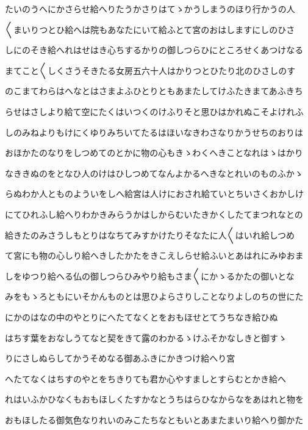 \documentclass[a4paper,11pt,landscape]{ltjtarticle}
\begin{document}
\par\medskip
たいのうへにかさらせ給へりたうかさりはてゝかうしまうのほり行かうの人
\par\medskip
〱まいりつとひ給へは院もあなたにいて給ふとて宮のおはしますにしのひさ
\par\medskip
しにのそき給へれはせはき心ちするかりの御しつらひにところせくあつけなる
\par\medskip
まてこと〱しくさうそきたる女房五六十人はかりつとひたり北のひさしのす
\par\medskip
のこまてわらはへなとはさまよふひとりともあまたしてけふたきまてあふきち
\par\medskip
らせはさしより給て空にたくはいつくのけふりそと思ひはかれぬこそよけれふ
\par\medskip
しのみねよりもけにくゆりみちいてたるはほいなきわさなりかうせちのおりは
\par\medskip
おほかたのなりをしつめてのとかに物の心もきゝわくへきことなれはゝはかり
\par\medskip
なききぬのをとなひ人のけはひしつめてなんよかるへきなとれいのものふかゝ
\par\medskip
らぬわか人とものよういをしへ給宮は人けにおされ給ていとちいさくおかしけ
\par\medskip
にてひれふし給へりわかきみらうかはしからむいたきかくしたてまつれなとの
\par\medskip
給きたのみさうしもとりはなちてみすかけたりそなたに人〱はいれ給しつめ
\par\medskip
て宮にも物の心しり給へきしたかたをきこえしらせ給ふいとあはれにみゆおま
\par\medskip
しをゆつり給へる仏の御しつらひみやり給もさま〱にかゝるかたの御いとな
\par\medskip
みをもゝろともにいそかんものとは思ひよらさりしことなりよしのちの世にた
\par\medskip
にかのはなの中のやとりにへたてなくとをおもほせとてうちなき給ひぬ
\par\medskip
はちす葉をおなしうてなと契をきて露のわかるゝけふそかなしきと御すゝ
\par\medskip
りにさしぬらしてかうそめなる御あふきにかきつけ給へり宮
\par\medskip
へたてなくはちすのやとをちきりても君か心やすましとすらむとかき給へ
\par\medskip
れはいふかひなくもおもほしくたすかなとうちはらひなからなをあはれと物を
\par\medskip
おもほしたる御気色なりれいのみこたちなともいとあまたまいり給へり御かた
\par\medskip
\end{document}
